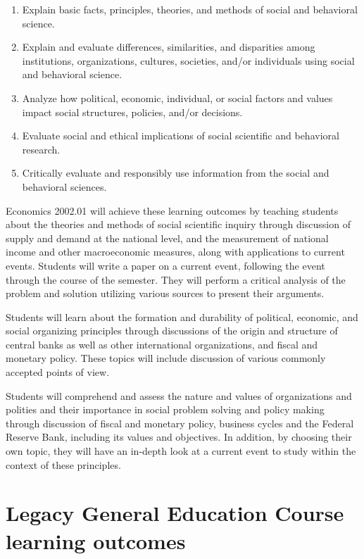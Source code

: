 \documentclass[12pt]{article}
\begin{document}
\begin{enumerate}
    \item Explain basic facts, principles, theories, and methods of social and behavioral science.
    \item Explain and evaluate differences, similarities, and disparities among institutions, organizations, cultures, societies, and/or individuals using social and behavioral science.
    \item Analyze how political, economic, individual, or social factors and values impact social structures, policies, and/or decisions.
    \item Evaluate social and ethical implications of social scientific and behavioral research.
    \item Critically evaluate and responsibly use information from the social and behavioral sciences.
\end{enumerate}

Economics 2002.01 will achieve these learning outcomes by teaching students about the theories and methods of social scientific inquiry through discussion of supply and demand at the national level, and the measurement of national income and other macroeconomic measures, along with applications to current events. Students will write a paper on a current event, following the event through the course of the semester. They will perform a critical analysis of the problem and solution utilizing various sources to present their arguments.

Students will learn about the formation and durability of political, economic, and social organizing principles through discussions of the origin and structure of central banks as well as other international organizations, and fiscal and monetary policy. These topics will include discussion of various commonly accepted points of view.

Students will comprehend and assess the nature and values of organizations and polities and their importance in social problem solving and policy making through discussion of fiscal and monetary policy, business cycles and the Federal Reserve Bank, including its values and objectives. In addition, by choosing their own topic, they will have an in-depth look at a current event to study within the context of these principles.

\newpage

\section*{Legacy General Education Course learning outcomes}
\end{document}
